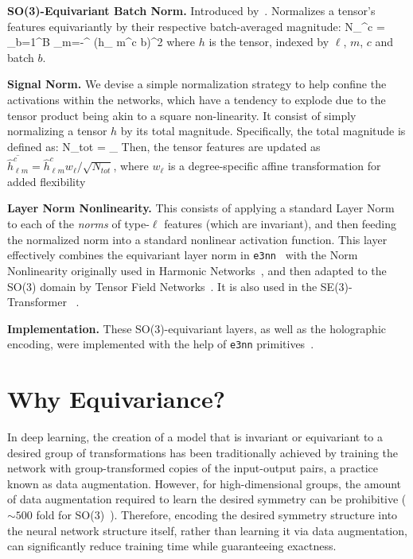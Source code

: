 \textbf{SO(3)-Equivariant Batch Norm.} Introduced by~\citep{kondor_clebsch-gordan_2018}. Normalizes
a tensor's features equivariantly by their respective batch-averaged magnitude:
\EQ
    N_{\ell}^{c} =  \sum_{b=1}^{B}  \sum_{m=-\ell}^{\ell} (h_{\ell
    m}^{c b})^2
    \label{eq:batch_norm}
\EE
where $h$ is the tensor, indexed by $\ell$, $m$, $c$ and batch $b$.

\textbf{Signal Norm.} We devise a simple normalization strategy to help confine the activations
within the networks, which have a tendency to explode due to the tensor product being akin to a
square non-linearity. It consist of simply normalizing a tensor $h$ by its total magnitude.
Specifically, the total magnitude is defined as:
\EQ
    N_{tot} = \sum_{\ell} 
    \label{eq:signal_norm}
\EE
Then, the tensor features are updated as $\overline{\hat h_{\ell m}^{c}} = {\hat h_{\ell m}^{c}}
w_{\ell}/{\sqrt{N_{tot}}}$, where $w_{\ell}$ is a degree-specific affine transformation for added
flexibility

\textbf{Layer Norm Nonlinearity.} This consists of applying a standard Layer
Norm~\citep{ba_layer_2016} to each of the \textit{norms} of type-$\ell$ features (which are
invariant), and then feeding the normalized norm into a standard nonlinear activation function.
This layer effectively combines the equivariant layer norm in
\texttt{e3nn}~\citep{geiger_e3nn_2022} with the Norm Nonlinearity originally used in Harmonic
Networks~\cite{worrall_harmonic_2017}, and then adapted to the SO(3) domain by Tensor Field
Networks~\citep{thomas_tensor_2018}. It is also used in the SE(3)-Transformer
~\citep{fuchs_se3-transformers_2020, noauthor_se3-transformers_nodate}.

\textbf{Implementation.} These SO(3)-equivariant layers, as well as the holographic encoding, were
implemented with the help of \texttt{e3nn} primitives~\citep{geiger_e3nn_2022}.


\section{Why Equivariance?}

In deep learning, the creation of a model that is invariant or equivariant to a desired group
of transformations has been traditionally achieved by training the network with group-transformed
copies of the input-output pairs, a practice known as data augmentation. However, for high-dimensional
groups, the amount of data augmentation required to learn the desired symmetry can be prohibitive
($\sim 500$ fold for SO(3)~\citep{geiger_e3nn_2022}). Therefore, encoding the desired symmetry structure
into the neural network structure itself, rather than learning it via data augmentation, can significantly
reduce training time while guaranteeing exactness.

